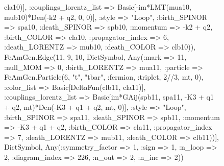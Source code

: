 \documentclass{revtex4}
\begin{document}
\begin{figure}[!htb]
\begin{center}
{cla10)], :couplings_lorentz_list => Basic[-im*LMT(mua10, mub10)*Den(-k2 + q2, 0, 0)], :style => "Loop", :birth_SPINOR => spa10, :death_SPINOR => spb10, :momentum => -k2 + q2, :birth_COLOR => cla10, :propagator_index => 6, :death_LORENTZ => mub10, :death_COLOR => clb10)), FeAmGen.Edge(11, 9, 10, Dict{Symbol, Any}(:mark => 11, :null_MOM => 0, :birth_LORENTZ => mua11, :particle => FeAmGen.Particle(6, "t", "tbar", :fermion, :triplet, 2//3, mt, 0), :color_list => Basic[DeltaFun(clb11, cla11)], :couplings_lorentz_list => Basic[im*GAij(spb11, spa11, -K3 + q1 + q2, mt)*Den(-K3 + q1 + q2, mt, 0)], :style => "Loop", :birth_SPINOR => spa11, :death_SPINOR => spb11, :momentum => -K3 + q1 + q2, :birth_COLOR => cla11, :propagator_index => 7, :death_LORENTZ => mub11, :death_COLOR => clb11))], Dict{Symbol, Any}(:symmetry_factor => 1, :sign => 1, :n_loop => 2, :diagram_index => 226, :n_out => 2, :n_inc => 2)) 
}
\end{center}
\end{figure}
\end{document}
